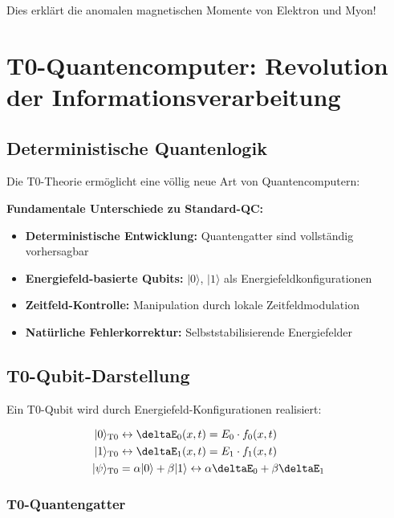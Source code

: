 	Dies erklärt die anomalen magnetischen Momente von Elektron und Myon!
	
	\section{T0-Quantencomputer: Revolution der Informationsverarbeitung}
	
	\subsection{Deterministische Quantenlogik}
	
	Die T0-Theorie ermöglicht eine völlig neue Art von Quantencomputern:
	
	\begin{tcolorbox}[colback=yellow!5!white,colframe=yellow!75!black,title=T0-Quantencomputer-Prinzipien]
		\textbf{Fundamentale Unterschiede zu Standard-QC:}
		\begin{itemize}
			\item \textbf{Deterministische Entwicklung:} Quantengatter sind vollständig vorhersagbar
			\item \textbf{Energiefeld-basierte Qubits:} $|0\rangle$, $|1\rangle$ als Energiefeldkonfigurationen
			\item \textbf{Zeitfeld-Kontrolle:} Manipulation durch lokale Zeitfeldmodulation
			\item \textbf{Natürliche Fehlerkorrektur:} Selbststabilisierende Energiefelder
		\end{itemize}
	\end{tcolorbox}
	
	\subsection{T0-Qubit-Darstellung}
	
	Ein T0-Qubit wird durch Energiefeld-Konfigurationen realisiert:
	
	\begin{align}
		|0\rangle_{\text{T0}} &\leftrightarrow \deltaE_0(x,t) = E_0 \cdot f_0(x,t) \\
		|1\rangle_{\text{T0}} &\leftrightarrow \deltaE_1(x,t) = E_1 \cdot f_1(x,t) \\
		|\psi\rangle_{\text{T0}} &= \alpha|0\rangle + \beta|1\rangle \leftrightarrow \alpha\deltaE_0 + \beta\deltaE_1
	\end{align}
	
	\subsubsection{T0-Quantengatter}
	
